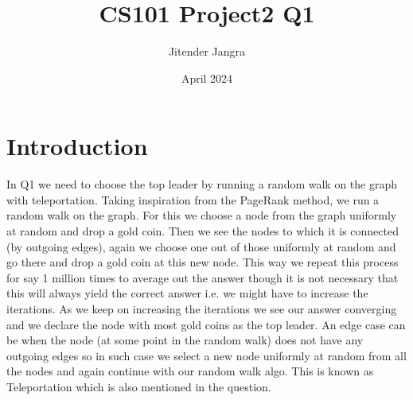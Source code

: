 \documentclass{article}
\title{CS101 Project2 Q1}
\author{Jitender Jangra}
\date{April 2024}
\begin{document}
\maketitle

\section{Introduction}
In Q1 we need to choose the top leader by running a random walk on the graph with teleportation.
Taking inspiration from the PageRank method, we run a random walk on the graph. For this we choose a node from the graph uniformly at random and drop a gold coin. Then we see the nodes to which it is connected (by outgoing edges), again we choose one out of those uniformly at random and go there and drop a gold coin at this new node. This way we repeat this process for say 1 million times to average out the answer though it is not necessary that this will always yield the correct answer i.e. we might have to increase the iterations.
As we keep on increasing the iterations we see our answer converging and we declare the node with most gold coins as the top leader.
An edge case can be when the node (at some point in the random walk) does not have any outgoing edges so in such case we select a new node uniformly at random from all the nodes and again continue with our random walk algo. This is known as Teleportation which is also mentioned in the question. 
\end{document}
